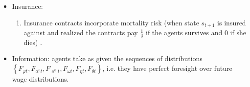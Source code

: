 \documentclass[notes=show]{beamer}
\begin{document}
\begin{frame}%


\begin{itemize}
\item Insurance:

\begin{enumerate}
\item Insurance contracts incorporate mortality risk (when state $s_{t+1}$
is insured against and realized the contracts pay $\frac{1}{\delta }$ if the
agents survives and $0$ if she dies) .
\end{enumerate}

\item Information: agents take as given the sequences of distributions $%
\left\{ F_{\varphi t},F_{\alpha ^{0}t},F_{\varkappa ^{0}t},F_{\omega
t},F_{\eta t},F_{\theta t}\right\} $, i.e. they have perfect foresight over
future wage distributions.
\end{itemize}

\transboxout%
\end{frame}%

\bigskip
\end{document}
